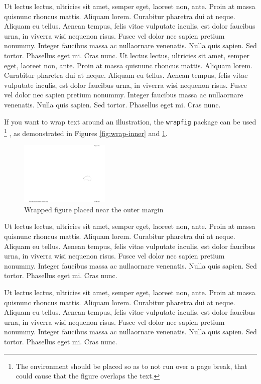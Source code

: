 Ut lectus lectus, ultricies sit amet, semper eget, laoreet non, ante. Proin at massa quisnunc rhoncus mattis. Aliquam lorem. Curabitur pharetra dui at neque. Aliquam eu tellus. Aenean tempus, felis vitae vulputate iaculis, est dolor faucibus urna, in viverra wisi nequenon risus. Fusce vel dolor nec sapien pretium nonummy. Integer faucibus massa ac nullaornare venenatis. Nulla quis sapien. Sed tortor. Phasellus eget mi. Cras nunc.
Ut lectus lectus, ultricies sit amet, semper eget, laoreet non, ante. Proin at massa quisnunc rhoncus mattis. Aliquam lorem. Curabitur pharetra dui at neque. Aliquam eu tellus. Aenean tempus, felis vitae vulputate iaculis, est dolor faucibus urna, in viverra wisi nequenon risus. Fusce vel dolor nec sapien pretium nonummy. Integer faucibus massa ac nullaornare venenatis. Nulla quis sapien. Sed tortor. Phasellus eget mi. Cras nunc.

If you want to wrap text around an illustration, the \texttt{wrapfig} package can be used
\footnote{The environment should be placed so as to not run over a page break, that could cause that the figure overlaps the text.}
, as demonstrated in Figures \ref{fig:wrap-inner} and \ref{fig:wrap-outer}.

\begin{figure}
  \centering 
  \includegraphics[width=0.38\textwidth]{Graphics/introaustralia}
  \caption{Wrapped figure placed near the outer margin}
  \label{fig:wrap-outer}
\end{figure}

Ut lectus lectus, ultricies sit amet, semper eget, laoreet non, ante. Proin at massa quisnunc rhoncus mattis. Aliquam lorem. Curabitur pharetra dui at neque. Aliquam eu tellus. Aenean tempus, felis vitae vulputate iaculis, est dolor faucibus urna, in viverra wisi nequenon risus. Fusce vel dolor nec sapien pretium nonummy. Integer faucibus massa ac nullaornare venenatis. Nulla quis sapien. Sed tortor. Phasellus eget mi. Cras nunc.

Ut lectus lectus, ultricies sit amet, semper eget, laoreet non, ante. Proin at massa quisnunc rhoncus mattis. Aliquam lorem. Curabitur pharetra dui at neque. Aliquam eu tellus. Aenean tempus, felis vitae vulputate iaculis, est dolor faucibus urna, in viverra wisi nequenon risus. Fusce vel dolor nec sapien pretium nonummy. Integer faucibus massa ac nullaornare venenatis. Nulla quis sapien. Sed tortor. Phasellus eget mi. Cras nunc.

